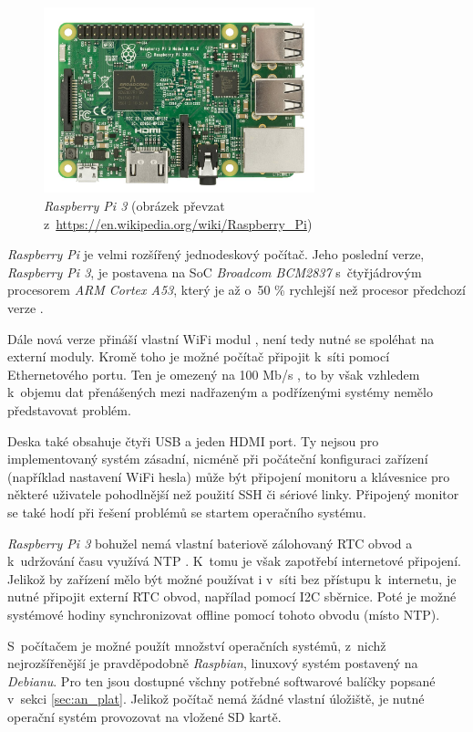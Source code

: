 \begin{figure}[h!]
    \centering
    \includegraphics[width=0.7\textwidth]{images/rpi.jpg}
    \caption[\textit{Raspberry Pi 3}]{\textit{Raspberry Pi 3} (obrázek převzat z~\url{https://en.wikipedia.org/wiki/Raspberry_Pi})}
    \label{fig:rpi}
\end{figure}

\textit{Raspberry Pi} je velmi rozšířený jednodeskový počítač. Jeho poslední verze, \textit{Raspberry Pi 3}, je postavena na SoC \textit{Broadcom BCM2837} s~čtyřjádrovým procesorem \textit{ARM Cortex A53}, který je až o~50 \% rychlejší než procesor předchozí verze \cite{rpi_benchoff}.

Dále nová verze přináší vlastní WiFi modul \cite{rpi_benchoff}, není tedy nutné se spoléhat na externí moduly. Kromě toho je možné počítač připojit k~síti pomocí Ethernetového portu. Ten je omezený na 100 Mb/s \cite{rpi_benchoff}, to by však vzhledem k~objemu dat přenášených mezi nadřazeným a podřízenými systémy nemělo představovat problém.

Deska také obsahuje čtyři USB a jeden HDMI port. Ty nejsou pro implementovaný systém zásadní, nicméně při počáteční konfiguraci zařízení (například nastavení WiFi hesla) může být připojení monitoru a klávesnice pro některé uživatele pohodlnější než použití SSH či sériové linky. Připojený monitor se také hodí při řešení problémů se startem operačního systému.

\textit{Raspberry Pi 3} bohužel nemá vlastní bateriově zálohovaný RTC obvod a k~udržování času využívá NTP \cite{rpi_rtc_ada}. K~tomu je však zapotřebí internetové připojení. Jelikož by zařízení mělo být možné používat i v~síti bez přístupu k~internetu, je nutné připojit externí RTC obvod, napřílad pomocí I2C sběrnice. Poté je možné systémové hodiny synchronizovat offline pomocí tohoto obvodu (místo NTP).

S~počítačem je možné použít množství operačních systémů, z~nichž nejrozšířenější je pravděpodobně \textit{Raspbian}, linuxový systém postavený na \textit{Debianu}. Pro ten jsou dostupné všchny potřebné softwarové balíčky popsané v~sekci \ref{sec:an_plat}. Jelikož počítač nemá žádné vlastní úložiště, je nutné operační systém provozovat na vložené SD kartě.

